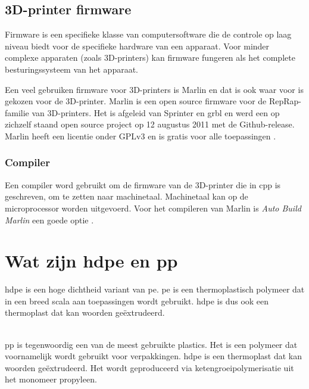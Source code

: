 \subsection{3D-printer firmware}

Firmware is een specifieke klasse van computersoftware die de controle op laag
niveau biedt voor de specifieke hardware van een apparaat.  Voor minder
complexe apparaten (zoals 3D-printers) kan firmware fungeren als het complete
besturingssysteem van het apparaat.

Een veel gebruiken firmware voor 3D-printers is Marlin en dat is ook waar voor
is gekozen voor de 3D-printer.  Marlin is een open source firmware voor de
RepRap-familie van 3D-printers. Het is afgeleid van Sprinter en grbl en werd
een op zichzelf staand open source project op 12 augustus 2011 met de
Github-release. Marlin heeft een licentie onder GPLv3 en is gratis voor alle
toepassingen \cite{Marlin}. 

\subsubsection{Compiler}

Een compiler word gebruikt om de firmware van de 3D-printer die in \ac{cpp} is
geschreven, om te zetten naar machinetaal. Machinetaal kan op de microprocessor
worden uitgevoerd.  Voor het compileren van Marlin is \emph{Auto Build Marlin}
een goede optie \cite{Auto_Build_Marlin}.


\section{Wat zijn \ac{hdpe} en \ac{pp}}

\ac{hdpe} is een hoge dichtheid variant van \ac{pe}. \ac{pe} is een
thermoplastisch polymeer dat in een breed scala aan toepassingen wordt
gebruikt. \ac{hdpe} is dus ook een thermoplast dat kan woorden geëxtrudeerd.\\\

\noindent \ac{pp} is tegenwoordig een van de meest gebruikte plastics. Het is
een polymeer dat voornamelijk wordt gebruikt voor verpakkingen. \ac{hdpe} is
een thermoplast dat kan woorden geëxtrudeerd. Het wordt geproduceerd via
ketengroeipolymerisatie uit het monomeer propyleen.

